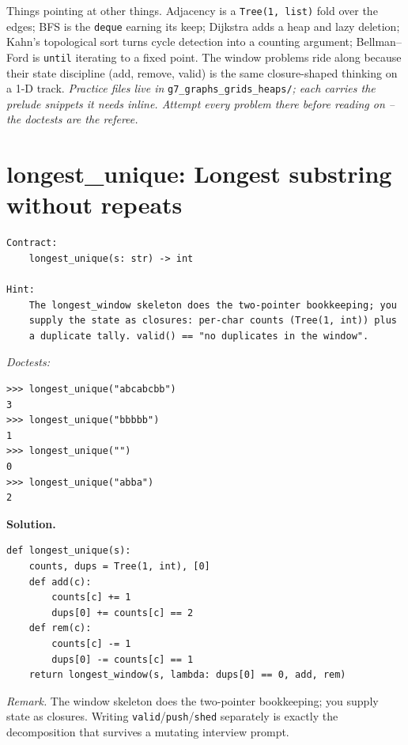 \documentclass[11pt,letterpaper]{book}
\begin{document}
Things pointing at other things. Adjacency is a \texttt{Tree(1, list)} fold
over the edges; BFS is the \texttt{deque} earning its keep; Dijkstra adds a
heap and lazy deletion; Kahn's topological sort turns cycle detection into a
counting argument; Bellman--Ford is \texttt{until} iterating to a fixed point.
The window problems ride along because their state discipline (add, remove,
valid) is the same closure-shaped thinking on a 1-D track.
\medskip\noindent\textit{Practice files live in }\texttt{g7\_graphs\_grids\_heaps/}\textit{;
each carries the prelude snippets it needs inline. Attempt every problem there
before reading on -- the doctests are the referee.}

\section{longest\_unique: Longest substring without repeats}
\begin{lstlisting}[style=spec]
Contract:
    longest_unique(s: str) -> int

Hint:
    The longest_window skeleton does the two-pointer bookkeeping; you
    supply the state as closures: per-char counts (Tree(1, int)) plus
    a duplicate tally. valid() == "no duplicates in the window".
\end{lstlisting}
\noindent\textit{Doctests:}
\begin{lstlisting}[style=spec]
>>> longest_unique("abcabcbb")
3
>>> longest_unique("bbbbb")
1
>>> longest_unique("")
0
>>> longest_unique("abba")
2
\end{lstlisting}
\noindent\textbf{Solution.}
\begin{lstlisting}[style=code]
def longest_unique(s):
    counts, dups = Tree(1, int), [0]
    def add(c):
        counts[c] += 1
        dups[0] += counts[c] == 2
    def rem(c):
        counts[c] -= 1
        dups[0] -= counts[c] == 1
    return longest_window(s, lambda: dups[0] == 0, add, rem)
\end{lstlisting}

\noindent\textit{Remark.} The window skeleton does the two-pointer bookkeeping;
you supply state as closures. Writing \texttt{valid}/\texttt{push}/\texttt{shed}
separately is exactly the decomposition that survives a mutating interview
prompt.
\end{document}
